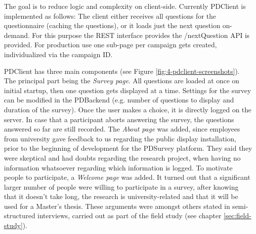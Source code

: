 		The goal is to reduce logic and complexity on client-side. Currently PDClient is implemented as follows: The client either receives all questions for the questionnaire (caching the questions), or it loads just the next question on-demand. For this purpose the REST interface provides the /nextQuestion API is provided. For production use one sub-page per campaign gets created, individualized via the campaign ID.
		

		PDClient has three main components (see Figure \ref{fig:4-pdclient-screenshots}). The principal part being the \textit{Survey page}. All questions are loaded at once on initial startup, then one question gets displayed at a time. Settings for the survey can be modified in the PDBackend (e.g. number of questions to display and duration of the survey). Once the user makes a choice, it is directly logged on the server. In case that a participant aborts answering the survey, the questions answered so far are still recorded. The \textit{About page} was added, since employees from university gave feedback to us regarding the public display installation, prior to the beginning of development for the PDSurvey platform. They said they were skeptical and had doubts regarding the research project, when having no information whatsoever regarding which information is logged. To motivate people to participate, a \textit{Welcome page} was added. It turned out that a significant larger number of people were willing to participate in a survey, after knowing that it doesn't take long, the research is university-related and that it will be used for a Master's thesis. These arguments were amongst others stated in semi-structured interviews, carried out as part of the field study (see chapter \ref{sec:field-study}).





